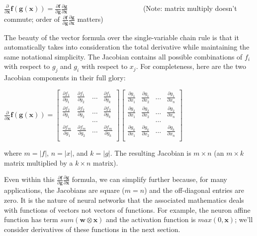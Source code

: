 \documentclass[11pt]{article}
\begin{document}
$\frac{\partial}{\partial \mathbf{x}} \mathbf{f}(\mathbf{g}(\mathbf{x})) = \frac{\partial \mathbf{f}}{\partial \mathbf{g}}\frac{\partial\mathbf{g}}{\partial \mathbf{x}}$ ~~~~~~~~~~~~~~~~~~~~~(Note: matrix multiply doesn't commute; order of $\frac{\partial \mathbf{f}}{\partial \mathbf{g}}\frac{\partial\mathbf{g}}{\partial \mathbf{x}}$ matters)

The beauty of the vector formula over the single-variable chain rule is that it automatically takes into consideration the total derivative while maintaining the same notational simplicity.  The Jacobian contains all possible combinations of $f_i$ with respect to $g_j$ and $g_i$ with respect to $x_j$. For completeness, here are the two Jacobian components in their full glory:

$
\frac{\partial}{\partial \mathbf{x}} \mathbf{f}(\mathbf{g}(\mathbf{x})) = \begin{bmatrix}
	\frac{\partial f_1}{\partial g_1} & \frac{\partial f_1}{\partial g_2} & \ldots & \frac{\partial f_1}{\partial g_k}\\
	\frac{\partial f_2}{\partial g_1} & \frac{\partial f_2}{\partial g_2} & \ldots & 	
\frac{\partial f_2}{\partial g_k}\\
	& &\ldots\\
	\frac{\partial f_m}{\partial g_1} & \frac{\partial f_m}{\partial g_2} & \ldots & \frac{\partial f_m}{\partial g_k}\\
\end{bmatrix}\begin{bmatrix}
	\frac{\partial g_1}{\partial x_1} & \frac{\partial g_1}{\partial x_2} & \ldots & \frac{\partial g_1}{\partial x_n}\\
	\frac{\partial g_2}{\partial x_1} & \frac{\partial g_2}{\partial x_2} & \ldots & 	
\frac{\partial g_2}{\partial x_n}\\
	& &\ldots\\
	\frac{\partial g_k}{\partial x_1} & \frac{\partial g_k}{\partial x_2} & \ldots & \frac{\partial g_k}{\partial x_n}\\
\end{bmatrix}
$

where $m=|f|$, $n=|x|$, and $k=|g|$. The resulting Jacobian is $m \times n$ (an $m \times k$ matrix multiplied by a $k \times n$ matrix). 

Even within this $\frac{\partial \mathbf{f}}{\partial \mathbf{g}}\frac{\partial\mathbf{g}}{\partial \mathbf{x}}$ formula, we can simplify further because, for many applications, the Jacobians are square ($m=n$) and the off-diagonal entries are zero.  It is the nature of neural networks that the associated mathematics deals with functions of vectors not vectors of functions. For example, the neuron affine function has term $sum(\mathbf{w}\otimes\mathbf{x})$ and the activation function is $max(0,\mathbf{x})$; we'll consider derivatives of these functions in the next section.  
\end{document}
